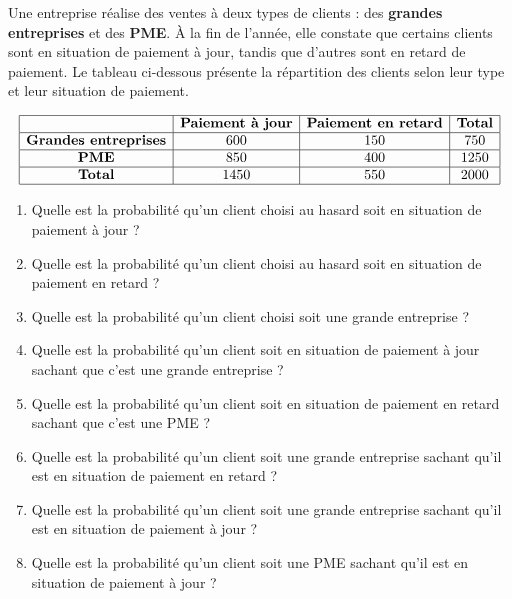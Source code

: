 \documentclass[11pt]{article}
\begin{document}
\begin{exercice}
  Une entreprise réalise des ventes à deux types de clients : des \textbf{grandes entreprises} et des \textbf{PME}. À la fin de l'année, elle constate que certains clients sont en situation de paiement à jour, tandis que d'autres sont en retard de paiement. Le tableau ci-dessous présente la répartition des clients selon leur type et leur situation de paiement.

\[
\begin{array}{|c|c|c|c|}
\hline
                          & \textbf{Paiement à jour} & \textbf{Paiement en retard} & \textbf{Total} \\
\hline
\textbf{Grandes entreprises}  & 600 & 150 & 750 \\ \hline
\textbf{PME}                  & 850 & 400 & 1250 \\
\hline
\textbf{Total}                & 1450 & 550 & 2000 \\
\hline
\end{array}
\]

\begin{multicols}{2}
  \begin{enumerate}
  \item Quelle est la probabilité qu'un client choisi au hasard soit
    en situation de paiement à jour ?
  \item Quelle est la probabilité qu'un client choisi au hasard soit
    en situation de paiement en retard ?
  \item Quelle est la probabilité qu'un client choisi soit une grande
    entreprise ?
  \item Quelle est la probabilité qu'un client soit en situation de
    paiement à jour sachant que c'est une grande entreprise ?
\item Quelle est la probabilité qu'un client soit en situation de
  paiement en retard sachant que c'est une PME ?
\item Quelle est la probabilité qu'un client soit une grande
  entreprise sachant qu'il est en situation de paiement en retard ?
\item Quelle est la probabilité qu'un client soit une grande
  entreprise sachant qu'il est en situation de paiement à jour ?
\item Quelle est la probabilité qu'un client soit une PME sachant
  qu'il est en situation de paiement à jour ?
\end{enumerate}
\end{multicols}
\end{exercice}
\end{document}
